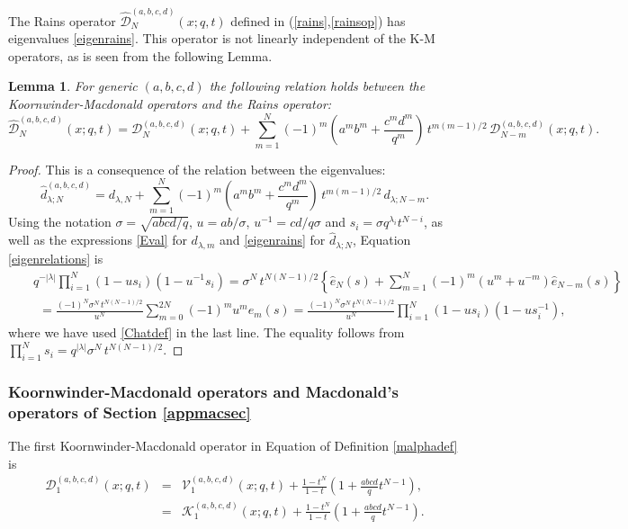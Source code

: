 \documentclass[12pt]{amsart}
\newtheorem{lemma}[thm]{Lemma}
\newcommand{\K}{{\mathcal K}}
\numberwithin{equation}{section}
\begin{document}
The Rains operator $\widehat{\mathcal D}_N^{(a,b,c,d)}(x;q,t)$ defined in  (\ref{rains},\ref{rainsop}) has eigenvalues \eqref{eigenrains}.
%
%
%
%
%
%
%
%
%
%
%
%
%
%
%
%
%
%
%
%
%
%
This operator is not linearly independent of the K-M operators, as is seen from the following Lemma.
%
\begin{lemma}\label{rainstokor}
For generic $(a,b,c,d)$ the following relation holds between the Koornwinder-Macdonald operators and the Rains operator:
\begin{equation}
\widehat{\mathcal D}_N^{(a,b,c,d)}(x;q,t)={\mathcal D}_{N}^{(a,b,c,d)}(x;q,t)+\sum_{m=1}^N (-1)^m\left(a^mb^m +\frac{c^md^m}{q^m}\right)\,t^{m(m-1)/2} \, 
{\mathcal D}_{N-m}^{(a,b,c,d)}(x;q,t).
\end{equation}
\end{lemma}
\begin{proof}
This is a consequence of the relation between the eigenvalues:
\begin{equation}\label{eigenrelations}
\hat{d}_{\lambda;N}^{(a,b,c,d)}=d_{\lambda,N}+\sum_{m=1}^N (-1)^m\left(a^mb^m +\frac{c^md^m}{q^m}\right)\,t^{m(m-1)/2} \,d_{\lambda;N-m} .
\end{equation}
Using the notation $\sigma=\sqrt{abcd/q}$, $u=ab/\sigma$, $u^{-1}=c d/q\sigma$ and
$s_i=\sigma q^{\lambda_i}t^{N-i}$, as well as the expressions \eqref{Eval} for $d_{\lambda,m}$ and \eqref{eigenrains} for $\hat{d}_{\lambda;N}$, Equation \eqref{eigenrelations} is
\begin{eqnarray*} 
&&q^{-|\lambda|} \prod_{i=1}^N (1-u s_i)(1-u^{-1} s_i)=\sigma^N\, t^{N(N-1)/2}\left\{ \hat{e}_N(s)+\sum_{m=1}^N (-1)^m (u^m+u^{-m}) \hat{e}_{N-m}(s) \right\}\\
&&\ \ =\frac{(-1)^N \sigma^N\, t^{N(N-1)/2}}{u^N} \sum_{m=0}^{2N} (-1)^m u^m \hat{e}_m(s)
=\frac{(-1)^N \sigma^N\, t^{N(N-1)/2}}{u^N}\prod_{i=1}^N(1-u s_i)(1-u s_i^{-1}),
\end{eqnarray*}
where we have used \eqref{Chatdef} in the last line.
The equality follows from $\prod_{i=1}^N s_i =q^{|\lambda|} \sigma^N\, t^{N(N-1)/2}$.
\end{proof}



\subsubsection{Koornwinder-Macdonald operators and Macdonald's operators of Section \ref{appmacsec}}
\label{usumacdo}

The first Koornwinder-Macdonald operator in Equation of Definition \ref{malphadef} is
\begin{eqnarray}
{\mathcal D}_1^{(a,b,c,d)}(x;q,t)&=&{\mathcal V}_1^{(a,b,c,d)}(x;q,t)+\frac{1-t^N}{1-t}\left( 1+ \frac{abcd}{q}t^{N-1}\right),
\nonumber \\
&=&
\K_1^{(a,b,c,d)}(x;q,t)+\frac{1-t^N}{1-t}\left( 1+ \frac{abcd}{q}t^{N-1}\right).\label{MaKop}
\end{eqnarray}
\end{document}
